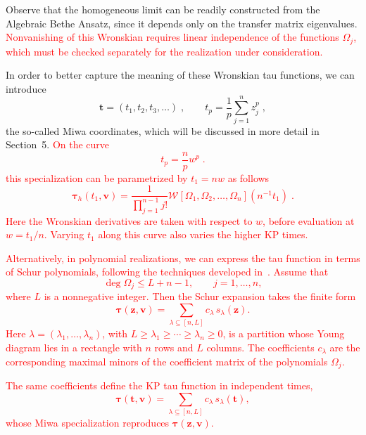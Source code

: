 \documentclass[a4paper,11pt]{amsart}
\begin{document}
Observe that the homogeneous limit can be readily constructed from the Algebraic Bethe Ansatz, since
it depends only on the transfer matrix eigenvalues. \textcolor{red}{Nonvanishing of this Wronskian requires linear
independence of the functions \(\Omega_j\), which must be checked separately for the realization under
consideration.}

In order to better capture the meaning of these Wronskian tau functions, we can introduce
\begin{equation}
  \label{eq:miwa-coord}
  \bm{t} = (t_1, t_2, t_3, \dots) \; , \qquad 
  t_p = \frac{1}{p}\sum_{j=1}^n z_j^p\; ,
\end{equation}
the so-called Miwa coordinates, which will be discussed in more detail in Section~5.
\textcolor{red}{On the curve
\begin{equation}
  t_p = \frac{n}{p} w^p\;. 
\end{equation}
this specialization can be parametrized by \(t_1 = n w\) as follows
\begin{equation}
  \bm{\tau}_h(t_1, \bm{v}) =\frac{1}{\prod_{j=1}^{n-1} j!}
  \mathcal{W}[\Omega_1, \Omega_2, \dots, \Omega_n](n^{-1}t_1)\;.
\end{equation}
Here the Wronskian derivatives are taken with respect to \(w\), before evaluation at
\(w=t_1/n\). Varying \(t_1\) along this curve also varies the higher KP times.}

\textcolor{red}{Alternatively, in polynomial realizations, we can express the tau
function in terms of Schur polynomials, following the techniques
developed in~\cite{Foda:2009zz, Wheeler:2010vmq, Foda:2010,
Takasaki:2010qm, Foda:2012wn, Foda:2012wf}.
Assume that
\[
  \deg \Omega_j \leq L+n-1, \qquad j=1,\ldots,n,
\]
where \(L\) is a nonnegative integer. Then the Schur expansion
takes the finite form
\begin{equation}
  \bm{\tau}(\bm{z},\bm{v})
  = \sum_{\lambda\subseteq[n,L]}
    c_\lambda\,s_\lambda(\bm{z}).
\end{equation}
Here \(\lambda=(\lambda_1,\ldots,\lambda_n)\), with
\(L\geq\lambda_1\geq\cdots\geq\lambda_n\geq0\), is a partition
whose Young diagram lies in a rectangle with \(n\) rows and
\(L\) columns. The coefficients \(c_\lambda\) are the corresponding
maximal minors of the coefficient matrix of the polynomials
\(\Omega_j\).}

\textcolor{red}{The same coefficients define the KP tau function in independent
times,
\begin{equation}
  \bm{\tau}(\bm{t},\bm{v})
  = \sum_{\lambda\subseteq[n,L]}
    c_\lambda\,s_\lambda(\bm{t}),
\end{equation}
whose Miwa specialization reproduces
\(\bm{\tau}(\bm{z},\bm{v})\).}
\end{document}
